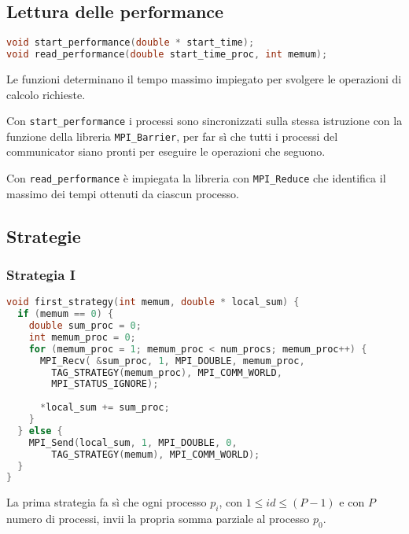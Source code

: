 \documentclass[a4paper,11pt]{book}
\begin{document}
\subsection{Lettura delle performance}
\begin{lstlisting}[language=C]
void start_performance(double * start_time);
void read_performance(double start_time_proc, int memum);
\end{lstlisting}
Le funzioni determinano il tempo massimo impiegato per svolgere le operazioni di calcolo richieste. \par 
Con \verb|start_performance| i processi sono sincronizzati sulla stessa istruzione con la funzione della libreria \verb|MPI_Barrier|, per far sì che tutti i processi del communicator siano pronti per eseguire le operazioni che seguono. \par 
Con \verb|read_performance| è impiegata la libreria con \verb|MPI_Reduce| che identifica il massimo dei tempi ottenuti da ciascun processo. 

\subsection{Strategie}
\subsubsection{Strategia I}
\begin{lstlisting}[language=C]
void first_strategy(int memum, double * local_sum) {
  if (memum == 0) {
    double sum_proc = 0;
    int memum_proc = 0;
    for (memum_proc = 1; memum_proc < num_procs; memum_proc++) {
      MPI_Recv( &sum_proc, 1, MPI_DOUBLE, memum_proc,
        TAG_STRATEGY(memum_proc), MPI_COMM_WORLD,
        MPI_STATUS_IGNORE);
        
      *local_sum += sum_proc;
    }
  } else {
    MPI_Send(local_sum, 1, MPI_DOUBLE, 0,
        TAG_STRATEGY(memum), MPI_COMM_WORLD);
  }
}
\end{lstlisting}
La prima strategia fa sì che ogni processo $p_i$, con $1 \leq id \leq (P-1)$ e con $P$ numero di processi, invii la propria somma parziale al processo $p_0$.
\end{document}

